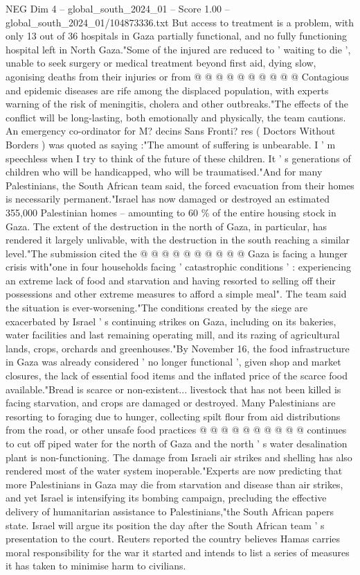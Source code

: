 \begin{textsample}{NEG Dim 4 – global\_south\_2024\_01 – Score 1.00 – global\_south\_2024\_01/104873336.txt}
But access to treatment is a problem, with only 13 out of 36 hospitals in Gaza partially functional, and no fully functioning hospital left in North Gaza."Some of the injured are reduced to ' waiting to die ', unable to seek surgery or medical treatment beyond first aid, dying slow, agonising deaths from their injuries or from @ @ @ @ @ @ @ @ @ @ Contagious and epidemic diseases are rife among the displaced population, with experts warning of the risk of meningitis, cholera and other outbreaks."The effects of the conflict will be long-lasting, both emotionally and physically, the team cautions.
An emergency co-ordinator for M? decins Sans Fronti? res ( Doctors Without Borders ) was quoted as saying :"The amount of suffering is unbearable.
I ' m speechless when I try to think of the future of these children.
It ' s generations of children who will be handicapped, who will be traumatised."And for many Palestinians, the South African team said, the forced evacuation from their homes is necessarily permanent."Israel has now damaged or destroyed an estimated 355,000 Palestinian homes -- amounting to 60 \% of the entire housing stock in Gaza.
The extent of the destruction in the north of Gaza, in particular, has rendered it largely unlivable, with the destruction in the south reaching a similar level."The submission cited the @ @ @ @ @ @ @ @ @ @ Gaza is facing a hunger crisis with"one in four households facing ' catastrophic conditions ' : experiencing an extreme lack of food and starvation and having resorted to selling off their possessions and other extreme measures to afford a simple meal".
The team said the situation is ever-worsening."The conditions created by the siege are exacerbated by Israel ' s continuing strikes on Gaza, including on its bakeries, water facilities and last remaining operating mill, and its razing of agricultural lands, crops, orchards and greenhouses."By November 16, the food infrastructure in Gaza was already considered ' no longer functional ', given shop and market closures, the lack of essential food items and the inflated price of the scarce food available."Bread is scarce or non-existent... livestock that has not been killed is facing starvation, and crops are damaged or destroyed.
Many Palestinians are resorting to foraging due to hunger, collecting spilt flour from aid distributions from the road, or other unsafe food practices @ @ @ @ @ @ @ @ @ @ continues to cut off piped water for the north of Gaza and the north ' s water desalination plant is non-functioning.
The damage from Israeli air strikes and shelling has also rendered most of the water system inoperable."Experts are now predicting that more Palestinians in Gaza may die from starvation and disease than air strikes, and yet Israel is intensifying its bombing campaign, precluding the effective delivery of humanitarian assistance to Palestinians,"the South African papers state.
Israel will argue its position the day after the South African team ' s presentation to the court.
Reuters reported the country believes Hamas carries moral responsibility for the war it started and intends to list a series of measures it has taken to minimise harm to civilians.

\end{textsample}
